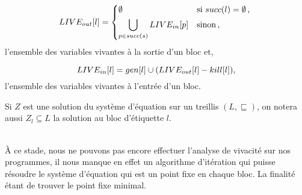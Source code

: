 \documentclass[a4paper, 11pt]{article}
\begin{document}
\[
	LIVE_{out}[l] = 
	\begin{dcases*}
		\emptyset &si $succ(l) = \emptyset $\,, \\
		\bigcup\limits_{p\in succ(s)} LIVE_{in}[p] &sinon\,,
	\end{dcases*}
\]
l'ensemble des variables vivantes à la sortie d'un bloc et,

\[
	LIVE_{in}[l] = gen[l] \cup (LIVE_{out}[l] - kill[l]),
\]
l'ensemble des variables vivantes à l'entrée d'un bloc.
\\
\begin{notation}
	Si $Z$ est une solution du système d'équation sur un treillis $(L, \sqsubseteq)$, on notera aussi $Z_l \subseteq L$
	la solution au bloc d'étiquette $l$.
\end{notation}
\\
À ce stade, nous ne pouvons pas encore effectuer l'analyse de vivacité sur nos programmes, il nous manque en
effet un algorithme d'itération qui puisse résoudre le système d'équation qui est un point fixe en chaque bloc.
La finalité étant de trouver le point fixe minimal.
\end{document}
